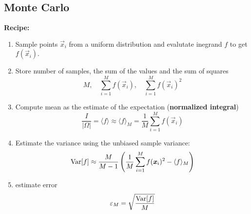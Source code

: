 \subsection{Monte Carlo}
    \textbf{Recipe:}
    \begin{enumerate}
        \item Sample points $\Vec{x}_i$ from a uniform distribution and evalutate inegrand $f$ to get $f(\Vec{x}_i)$.
        
        \item Store number of samples, the sum of the values and the sum of squares
        \begin{equation*}
            M, \quad \sum_{i=1}^M f(\Vec{x}_i), \quad \sum_{i=1}^M f(\Vec{x}_i)^2
        \end{equation*}
\vspace{-2mm}       
        \item Compute mean as the estimate of the expectation (\textbf{normalized integral})
        \begin{equation*}
            \frac{I}{|\Omega|} = \langle f \rangle \approx \langle f \rangle_M = \frac{1}{M}\sum_{i=1}^M f(\Vec{x}_i)
        \end{equation*}
\vspace{-2mm}        
        \item Estimate the variance using the unbiased sample variance:
        \begin{equation*}
            \textnormal{Var}[f] \approx \frac{M}{M-1}\left(\frac{1}{M}\sum_{i=1}^M f(\Vec{x}_i)^2-\langle f \rangle_M\right)
        \end{equation*}
\vspace{-2mm}       
        \item estimate error
        \begin{equation*}
            \varepsilon_M = \sqrt{\frac{\textnormal{Var}[f]}{M}}
        \end{equation*}
    \end{enumerate}
    